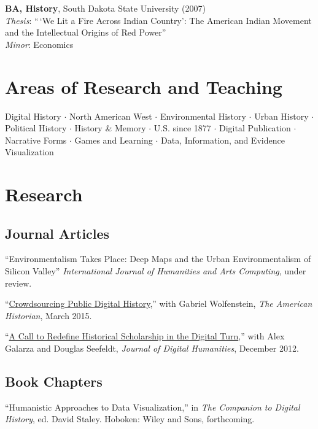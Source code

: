 \textbf{BA, History}, South Dakota State University (2007)\\
\emph{Thesis}: ``\,`We Lit a Fire Across Indian Country': The American
Indian Movement and the Intellectual Origins of Red Power''\\
\emph{Minor}: Economics

\section{Areas of Research and
Teaching}\label{areas-of-research-and-teaching}

Digital History \(\cdot\) North American West \(\cdot\) Environmental
History \(\cdot\) Urban History \(\cdot\) Political History \(\cdot\)
History \& Memory \(\cdot\) U.S. since 1877 \(\cdot\) Digital
Publication \(\cdot\) Narrative Forms \(\cdot\) Games and Learning
\(\cdot\) Data, Information, and Evidence Visualization

\section{Research}\label{research}

\subsection{Journal Articles}\label{journal-articles}

``Environmentalism Takes Place: Deep Maps and the Urban Environmentalism
of Silicon Valley'' \emph{International Journal of Humanities and Arts
Computing}, under review.

``\href{http://tah.oah.org/content/crowdsourcing-digital-public-history/}{Crowdsourcing
Public Digital History},'' with Gabriel Wolfenstein, \emph{The American
Historian}, March 2015.

``\href{http://journalofdigitalhumanities.org/1-4/a-call-to-redefine-historical-scholarship-in-the-digital-turn/}{A
Call to Redefine Historical Scholarship in the Digital Turn},'' with
Alex Galarza and Douglas Seefeldt, \emph{Journal of Digital Humanities},
December 2012.

\subsection{Book Chapters}\label{book-chapters}

``Humanistic Approaches to Data Visualization,'' in \emph{The Companion
to Digital History}, ed. David Staley. Hoboken: Wiley and Sons,
forthcoming.

